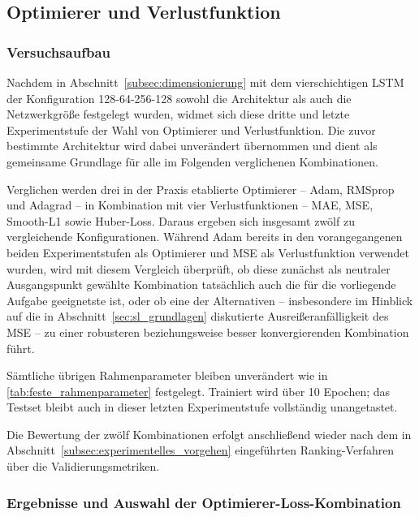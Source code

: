 \subsection{Optimierer und Verlustfunktion}
\label{subsec:optimizer_loss}

\subsubsection{Versuchsaufbau}
\label{subsubsec:optimizer_loss_sweep}

Nachdem in Abschnitt~\ref{subsec:dimensionierung} mit dem vierschichtigen \gls{LSTM} der Konfiguration 128-64-256-128 sowohl die Architektur als auch die Netzwerkgröße festgelegt wurden, widmet sich diese dritte und letzte Experimentstufe der Wahl von Optimierer und Verlustfunktion. Die zuvor bestimmte Architektur wird dabei unverändert übernommen und dient als gemeinsame Grundlage für alle im Folgenden verglichenen Kombinationen.

Verglichen werden drei in der Praxis etablierte Optimierer -- \gls{Adam}, \gls{RMSprop} und \gls{Adagrad} -- in Kombination mit vier Verlustfunktionen -- \gls{MAE}, \gls{MSE}, Smooth-L1 sowie Huber-Loss. Daraus ergeben sich insgesamt zwölf zu vergleichende Konfigurationen. Während \gls{Adam} bereits in den vorangegangenen beiden Experimentstufen als Optimierer und \gls{MSE} als Verlustfunktion verwendet wurden, wird mit diesem Vergleich überprüft, ob diese zunächst als neutraler Ausgangspunkt gewählte Kombination tatsächlich auch die für die vorliegende Aufgabe geeignetste ist, oder ob eine der Alternativen -- insbesondere im Hinblick auf die in Abschnitt~\ref{sec:sl_grundlagen} diskutierte Ausreißeranfälligkeit des \gls{MSE} -- zu einer robusteren beziehungsweise besser konvergierenden Kombination führt.

Sämtliche übrigen Rahmenparameter bleiben unverändert wie in \autoref{tab:feste_rahmenparameter} festgelegt. Trainiert wird über 10 Epochen; das Testset bleibt auch in dieser letzten Experimentstufe vollständig unangetastet.

Die Bewertung der zwölf Kombinationen erfolgt anschließend wieder nach dem in Abschnitt~\ref{subsec:experimentelles_vorgehen} eingeführten Ranking-Verfahren über die Validierungsmetriken.

\subsubsection{Ergebnisse und Auswahl der Optimierer-Loss-Kombination}
\label{subsubsec:optimizer_loss_ergebnisse}


